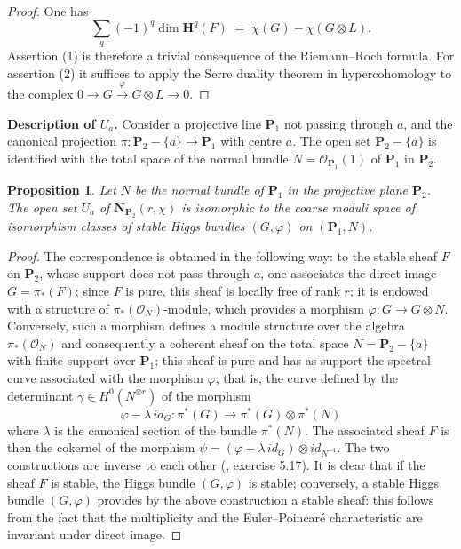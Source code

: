 \documentclass[12pt,english]{smfart}%
\theoremstyle{plain}
\newtheorem{proposition}[theorem]{Proposition}
\theoremstyle{definition}
\theoremstyle{remark}
\newcommand{\PP}{\mathbf{P}}
\newcommand{\Oh}{\mathcal{O}}
\newcommand{\origpage}[1]{\marginnote{\scriptsize\itshape p.~#1}}
\begin{document}
\begin{proof}
One has
\[
\sum_{q}(-1)^{q}\dim\mathbf{H}^{q}(F) \;=\; \chi(G) - \chi(G\otimes L).
\]
\origpage{648}%
Assertion (1) is therefore a trivial consequence of the Riemann--Roch formula. For assertion (2) it suffices to apply the Serre duality theorem in hypercohomology to the complex $0\to G\stackrel{\varphi}{\to}G\otimes L\to 0$.
\end{proof}

\medskip
\noindent\textbf{Description of $U_{a}$.} Consider a projective line $\PP_{1}$ not passing through $a$, and the canonical projection $\pi:\PP_{2}-\{a\}\to\PP_{1}$ with centre $a$. The open set $\PP_{2}-\{a\}$ is identified with the total space of the normal bundle $N=\Oh_{\PP_{1}}(1)$ of $\PP_{1}$ in $\PP_{2}$.

\begin{proposition}\label{prop:Ua-higgs}
Let $N$ be the normal bundle of $\PP_{1}$ in the projective plane $\PP_{2}$. The open set $U_{a}$ of $\mathbf{N}_{\PP_{2}}(r,\chi)$ is isomorphic to the coarse moduli space of isomorphism classes of stable Higgs bundles $(G,\varphi)$ on $(\PP_{1},N)$.
\end{proposition}

\begin{proof}
The correspondence is obtained in the following way: to the stable sheaf $F$ on $\PP_{2}$, whose support does not pass through $a$, one associates the direct image $G=\pi_{*}(F)$; since $F$ is pure, this sheaf is locally free of rank $r$; it is endowed with a structure of $\pi_{*}(\Oh_{N})$-module, which provides a morphism $\varphi:G\to G\otimes N$. Conversely, such a morphism defines a module structure over the algebra $\pi_{*}(\Oh_{N})$ and consequently a coherent sheaf on the total space $N=\PP_{2}-\{a\}$ with finite support over $\PP_{1}$; this sheaf is pure and has as support the spectral curve associated with the morphism $\varphi$, that is, the curve defined by the determinant $\gamma\in H^{0}(N^{\otimes r})$ of the morphism
\[
\varphi - \lambda\, id_{G} : \pi^{*}(G) \longrightarrow \pi^{*}(G)\otimes\pi^{*}(N)
\]
where $\lambda$ is the canonical section of the bundle $\pi^{*}(N)$. The associated sheaf $F$ is then the cokernel of the morphism $\psi=(\varphi-\lambda\, id_{G})\otimes id_{N^{-1}}$. The two constructions are inverse to each other (\cite{Har}, exercise 5.17). It is clear that if the sheaf $F$ is stable, the Higgs bundle $(G,\varphi)$ is stable; conversely, a stable Higgs bundle $(G,\varphi)$ provides by the above construction a stable sheaf: this follows from the fact that the multiplicity and the Euler--Poincar\'e characteristic are invariant under direct image.
\end{proof}
\end{document}
